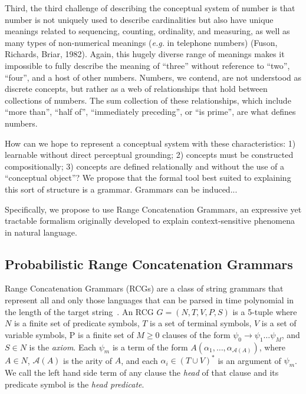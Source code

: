 \documentclass[10pt,letterpaper]{article}
\begin{document}
Third, the third challenge of describing the conceptual system of
number is that number is not uniquely used to describe cardinalities
but also have unique meanings related to sequencing, counting,
ordinality, and measuring, as well as many types of non-numerical
meanings ({\it e.g.} in telephone numbers) (Fuson, Richards, Briar,
1982). Again, this hugely diverse range of meanings makes it
impossible to fully describe the meaning of ``three'' without
reference to ``two'', ``four'', and a host of other numbers. Numbers,
we contend, are not understood as discrete concepts, but rather as a
web of relationships that hold between collections of numbers. The sum
collection of these relationships, which include ``more than'', ``half
of'', ``immediately preceding'', or ``is prime'', are what defines
numbers.

How can we hope to represent a conceptual system with these
characteristics: 1) learnable without direct perceptual grounding; 2)
concepts must be constructed compositionally; 3) concepts are defined
relationally and without the use of a ``conceptual object''? We
propose that the formal tool best suited to explaining this sort of
structure is a grammar. Grammars can be induced...

Specifically, we propose to use Range Concatenation Grammars, an
expressive yet tractable formalism originally developed to explain
context-sensitive phenomena in natural language.

\subsection{Probabilistic Range Concatenation Grammars}

Range Concatenation Grammars (RCGs) are a class of string grammars
that represent all and only those languages that can be parsed in time
polynomial in the length of the target
string~\cite{boullier2005range}. An RCG $G=(N, T, V, P, S)$ is a
5-tuple where $N$ is a finite set of predicate symbols, $T$ is a set
of terminal symbols, $V$ is a set of variable symbols, P is a finite
set of $M \geq 0$ clauses of the form $\psi_0 \rightarrow \psi_1 \dots
\psi_M$, and $S \in N$ is the \emph{axiom}. Each $\psi_m$ is a term of
the form $A(\alpha_1, \dots, \alpha_{\mathcal{A}(A)})$, where $A \in
N$, $\mathcal{A}(A)$ is the arity of $A$, and each $\alpha_i \in (T
\cup V)^*$ is an argument of $\psi_m$. We call the left hand side term
of any clause the \emph{head} of that clause and its predicate symbol
is the \emph{head predicate}.
\end{document}

